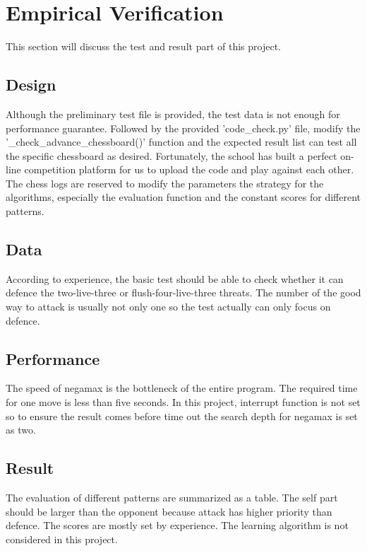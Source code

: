 \documentclass[conference,compsoc]{IEEEtran}
\begin{document}
 
\section{Empirical Verification}
This section will discuss the test and result part of this project.

\subsection{Design}
Although the preliminary test file is provided, the test data is not enough for performance guarantee. Followed by the provided 'code\_check.py' file, modify the '\_check\_advance\_chessboard()' function and the expected result list can test all the specific chessboard as desired.
Fortunately, the school has built a perfect on-line competition platform for us to upload the code and play against each other. The chess logs are reserved to modify the parameters the strategy for the algorithms, especially the evaluation function and the constant scores for different patterns.

\subsection{Data}
According to experience, the basic test should be able to check whether it can defence the two-live-three or flush-four-live-three threats. The number of the good way to attack is usually not only one so the test actually can only focus on defence.  
\subsection{Performance}
The speed of negamax is the bottleneck of the entire program. The required time for one move is less than five seconds. In this project, interrupt function is not set so to ensure the result comes before time out the search depth for negamax is set as two.
\subsection{Result}
The evaluation of different patterns are summarized as a table. The self part should be larger than the opponent because attack has higher priority than defence. The scores are mostly set by experience. The learning algorithm is not considered in this project.
\end{document}
